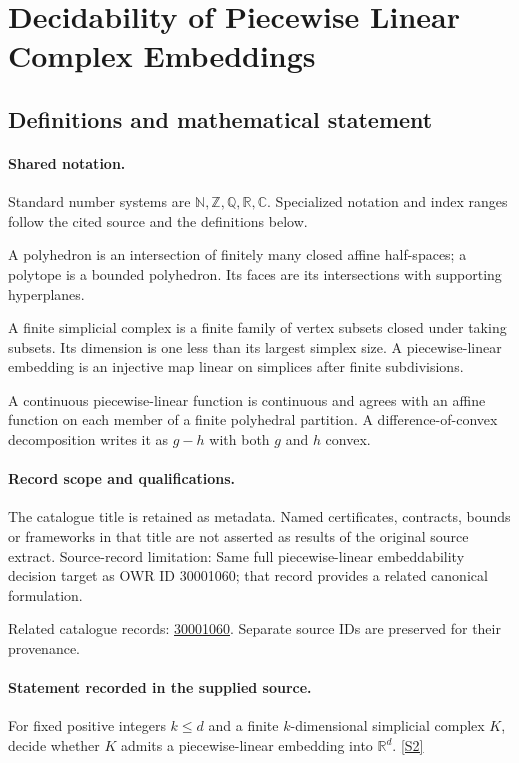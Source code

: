 \documentclass[11pt]{article}
\newcommand{\sref}[2]{\hyperlink{source:#1:#2}{[S#2]}}
\begin{document}
\section{Decidability of Piecewise Linear Complex Embeddings}\label{statement}

\subsection{Definitions and mathematical statement}

\paragraph{Shared notation.}Standard number systems are $\mathbb N,\mathbb Z,\mathbb Q,\mathbb R,\mathbb C$. Specialized notation and index ranges follow the cited source and the definitions below.


A polyhedron is an intersection of finitely many closed affine half-spaces; a polytope is a bounded polyhedron. Its faces are its intersections with supporting hyperplanes.

A finite simplicial complex is a finite family of vertex subsets closed under taking subsets. Its dimension is one less than its largest simplex size. A piecewise-linear embedding is an injective map linear on simplices after finite subdivisions.

A continuous piecewise-linear function is continuous and agrees with an affine function on each member of a finite polyhedral partition. A difference-of-convex decomposition writes it as $g-h$ with both $g$ and $h$ convex.
\paragraph{Record scope and qualifications.}
The catalogue title is retained as metadata. Named certificates, contracts, bounds or frameworks in that title are not asserted as results of the original source extract.
Source-record limitation: Same full piecewise-linear embeddability decision target as OWR ID 30001060; that record provides a related canonical formulation.

Related catalogue records: \href{https://mehmetmars7.github.io/Erdosproblems-llm-hunter/problem.html?type=open_problems&id=30001060}{30001060}. Separate source IDs are preserved for their provenance.
\paragraph{Statement recorded in the supplied source.}
For fixed positive integers $k\leq d$ and a finite $k$-dimensional simplicial complex $K$, decide whether $K$ admits a piecewise-linear embedding into $\mathbb R^d$. \sref{statement}{2}
\end{document}
